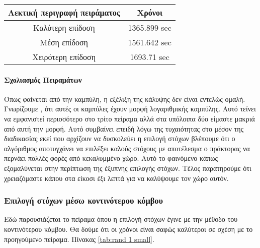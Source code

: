 
\begingroup
\centering
\begin{tabular}{c | c }
	\textbf{Λεκτική περιγραφή πειράματος} & \textbf{Χρόνοι}\\ \hline{}
	Καλύτερη επίδοση & 1365.899 sec \\ \hline
	Μέση επίδοση & 1561.642 sec   \\ \hline
	Χειρότερη επίδοση & 1693.71 sec \\
\end{tabular}
\label{tab:rand 1 small}
\endgroup
\paragraph{Σχολιασμός Πειραμάτων}


Όπως φαίνεται από την καμπύλη, η εξέλιξη της κάλυψης δεν είναι εντελώς ομαλή. Γνωρίζουμε \cite{2013},\cite{Tsardoulias2013} ότι αυτές οι καμπύλες έχουν μορφή λογαριθμικής καμπύλης. Αυτό τείνει να εμφανιστεί περισσότερο στο τρίτο πείραμα αλλά στα υπόλοιπα δύο είμαστε μακριά από αυτή την μορφή. Αυτό συμβαίνει επειδή λόγω της τυχαιότητας στο μέσον της διαδικασίας εκεί που αρχίζουν να δυσκολεύει η επιλογή στόχων βλέπουμε ότι ο αλγόριθμος αποτυγχάνει να επιλέξει καλούς στόχους με αποτέλεσμα ο πράκτορας να περνάει πολλές φορές από κεκαλυμμένο χώρο. Αυτό το φαινόμενο κάπως εξομαλύνεται στην περίπτωση της έξυπνης επιλογής στόχων. Τέλος παρατηρούμε ότι χρειαζόμαστε κάπου στα είκοσι έξι λεπτά για να καλύψουμε τον χώρο αυτόν.


\subsubsection{Επιλογή στόχων μέσω κοντινότερου κόμβου}

Εδώ παρουσιάζεται το πείραμα όπου η επιλογή στόχων έγινε με την μέθοδο του κοντινότερου κόμβου. Θα δούμε ότι οι χρόνοι είναι σαφώς καλύτεροι σε σχέση με το προηγούμενο πείραμα. Πίνακας \ref{tab:rand 1 small}.


